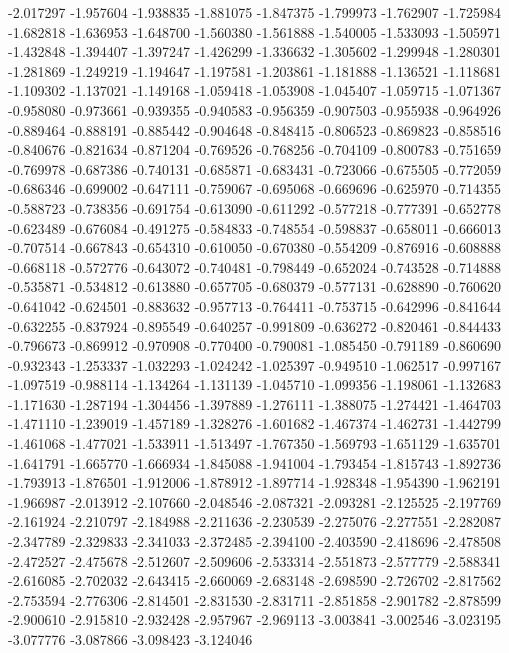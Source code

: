 -2.017297
-1.957604
-1.938835
-1.881075
-1.847375
-1.799973
-1.762907
-1.725984
-1.682818
-1.636953
-1.648700
-1.560380
-1.561888
-1.540005
-1.533093
-1.505971
-1.432848
-1.394407
-1.397247
-1.426299
-1.336632
-1.305602
-1.299948
-1.280301
-1.281869
-1.249219
-1.194647
-1.197581
-1.203861
-1.181888
-1.136521
-1.118681
-1.109302
-1.137021
-1.149168
-1.059418
-1.053908
-1.045407
-1.059715
-1.071367
-0.958080
-0.973661
-0.939355
-0.940583
-0.956359
-0.907503
-0.955938
-0.964926
-0.889464
-0.888191
-0.885442
-0.904648
-0.848415
-0.806523
-0.869823
-0.858516
-0.840676
-0.821634
-0.871204
-0.769526
-0.768256
-0.704109
-0.800783
-0.751659
-0.769978
-0.687386
-0.740131
-0.685871
-0.683431
-0.723066
-0.675505
-0.772059
-0.686346
-0.699002
-0.647111
-0.759067
-0.695068
-0.669696
-0.625970
-0.714355
-0.588723
-0.738356
-0.691754
-0.613090
-0.611292
-0.577218
-0.777391
-0.652778
-0.623489
-0.676084
-0.491275
-0.584833
-0.748554
-0.598837
-0.658011
-0.666013
-0.707514
-0.667843
-0.654310
-0.610050
-0.670380
-0.554209
-0.876916
-0.608888
-0.668118
-0.572776
-0.643072
-0.740481
-0.798449
-0.652024
-0.743528
-0.714888
-0.535871
-0.534812
-0.613880
-0.657705
-0.680379
-0.577131
-0.628890
-0.760620
-0.641042
-0.624501
-0.883632
-0.957713
-0.764411
-0.753715
-0.642996
-0.841644
-0.632255
-0.837924
-0.895549
-0.640257
-0.991809
-0.636272
-0.820461
-0.844433
-0.796673
-0.869912
-0.970908
-0.770400
-0.790081
-1.085450
-0.791189
-0.860690
-0.932343
-1.253337
-1.032293
-1.024242
-1.025397
-0.949510
-1.062517
-0.997167
-1.097519
-0.988114
-1.134264
-1.131139
-1.045710
-1.099356
-1.198061
-1.132683
-1.171630
-1.287194
-1.304456
-1.397889
-1.276111
-1.388075
-1.274421
-1.464703
-1.471110
-1.239019
-1.457189
-1.328276
-1.601682
-1.467374
-1.462731
-1.442799
-1.461068
-1.477021
-1.533911
-1.513497
-1.767350
-1.569793
-1.651129
-1.635701
-1.641791
-1.665770
-1.666934
-1.845088
-1.941004
-1.793454
-1.815743
-1.892736
-1.793913
-1.876501
-1.912006
-1.878912
-1.897714
-1.928348
-1.954390
-1.962191
-1.966987
-2.013912
-2.107660
-2.048546
-2.087321
-2.093281
-2.125525
-2.197769
-2.161924
-2.210797
-2.184988
-2.211636
-2.230539
-2.275076
-2.277551
-2.282087
-2.347789
-2.329833
-2.341033
-2.372485
-2.394100
-2.403590
-2.418696
-2.478508
-2.472527
-2.475678
-2.512607
-2.509606
-2.533314
-2.551873
-2.577779
-2.588341
-2.616085
-2.702032
-2.643415
-2.660069
-2.683148
-2.698590
-2.726702
-2.817562
-2.753594
-2.776306
-2.814501
-2.831530
-2.831711
-2.851858
-2.901782
-2.878599
-2.900610
-2.915810
-2.932428
-2.957967
-2.969113
-3.003841
-3.002546
-3.023195
-3.077776
-3.087866
-3.098423
-3.124046
